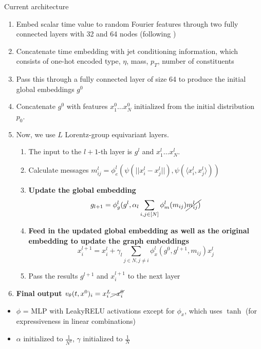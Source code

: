 \documentclass[handout, aspectratio=169,xcolor=dvipsnames]{beamer}
\begin{document}
\begin{frame}[allowframebreaks]{Current architecture}
    \begin{enumerate}
        \item Embed scalar time value to random Fourier features through two fully connected layers with 32 and 64 nodes (following \cite{wuFastPointCloud2023})
        \item Concatenate time embedding with jet conditioning information, which consists of one-hot encoded type, $\eta$, mass, $p_T$, number of constituents
        \item Pass this through a fully connected layer of size 64 to produce the initial global embeddings $g^0$
        \item Concatenate $g^0$ with features $x_1^0 \dots x_N^0$ initialized from the initial distribution $p_0$.
        \item Now, we use $L$ Lorentz-group equivariant layers. \begin{enumerate}
            \item The input to the $l+1$-th layer is $g^l$ and $x^{l}_1 \dots x^l_N$.
            \item Calculate messages $m^l_{ij} = \phi_e^l(\psi(||x_i^l - x_j^l||), \psi(\langle x_i^l, x_j^l \rangle))$
            \item \textbf{Update the global embedding $$g_{l+1} = \phi^l_{g}(g^l, \alpha_l \sum\limits_{i, j \in [N]}  \phi_m^l(m_{ij}) \cancel{m^l_{ij})}$$}
            \item \textbf{Feed in the updated global embedding as well as the original embedding to update the graph embeddings} $$
            x_i^{l+1} = x_i^{l} + \gamma_l \sum\limits_{j \in N, j \neq i} \phi^l_{x} (g^0, g^{l+1}, m_{ij}) x_j^l
            $$
            \item Pass the results $g^{l+1}$ and $x_i^{l+1}$ to the next layer
        \end{enumerate}
        \item \textbf{Final output $v_\theta(t, x^0)_i = x_i^L \cancel{- x_i^{0}}$}
    \end{enumerate}

    \begin{itemize}
        \item $\phi$ = MLP with LeakyRELU activations except for $\phi_x$, which uses $\tanh$ (for expressiveness in linear combinations)
        \item $\alpha$ initialized to $\frac{1}{N^2}$, $\gamma$ initialized to $\frac{1}{N}$ 
    \end{itemize}
\end{frame}
\end{document}
